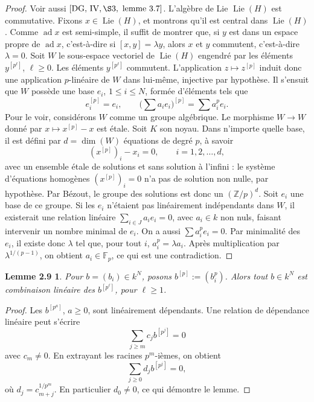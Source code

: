 \documentclass[11pt]{article}
\newcommand{\Lie}{\operatorname{Lie}}
\newtheorem*{lemme29}{Lemme 2.9}
\begin{document}
\begin{proof}
Voir aussi \([\mathrm{DG},\,\mathrm{IV},\S3,\text{ lemme }3.7]\). L'algèbre de Lie
\(\Lie(H)\) est commutative. Fixons \(x\in\Lie(H)\), et montrons qu'il est central dans
\(\Lie(H)\). Comme \(\operatorname{ad}x\) est semi-simple, il suffit de montrer que, si
\(y\) est dans un espace propre de \(\operatorname{ad}x\), c'est-à-dire si
\([x,y]=\lambda y\), alors \(x\) et \(y\) commutent, c'est-à-dire \(\lambda=0\). Soit
\(W\) le sous-espace vectoriel de \(\Lie(H)\) engendré par les éléments
\(y^{[p^\ell]}\), \(\ell\ge0\). Les éléments \(y^{[p^\ell]}\) commutent. L'application
\(z\mapsto z^{[p]}\) induit donc une application \(p\)-linéaire de \(W\) dans lui-même,
injective par hypothèse. Il s'ensuit que \(W\) possède une base \(e_i\),
\(1\le i\le N\), formée d'éléments tels que
\[
  e_i^{[p]}=e_i,
  \qquad
  \Big(\sum a_i e_i\Big)^{[p]}=\sum a_i^p e_i.
\]
Pour le voir, considérons \(W\) comme un groupe algébrique. Le morphisme \(W\to W\)
donné par \(x\mapsto x^{[p]}-x\) est étale. Soit \(K\) son noyau. Dans n'importe
quelle base, il est défini par \(d=\dim(W)\) équations de degré \(p\), à savoir
\[
  (x^{[p]})_i-x_i=0,
  \qquad i=1,2,\ldots,d,
\]
avec un ensemble étale de solutions et sans solution à l'infini : le système d'équations
homogènes \((x^{[p]})_i=0\) n'a pas de solution non nulle, par hypothèse. Par Bézout,
le groupe des solutions est donc un \((\mathbb Z/p)^d\). Soit \(e_i\) une base de ce
groupe. Si les \(e_i\) n'étaient pas linéairement indépendants dans \(W\), il existerait
une relation linéaire \(\sum_{i\in J} a_i e_i=0\), avec \(a_i\in k\) non nuls, faisant
intervenir un nombre minimal de \(e_i\). On a aussi \(\sum a_i^p e_i=0\). Par minimalité
des \(e_i\), il existe donc \(\lambda\) tel que, pour tout \(i\), \(a_i^p=\lambda a_i\).
Après multiplication par \(\lambda^{1/(p-1)}\), on obtient \(a_i\in\mathbb F_p\), ce
qui est une contradiction.
\end{proof}

\begin{lemme29}
Pour \(b=(b_i)\in k^N\), posons \(b^{[p]}:=(b_i^p)\). Alors tout \(b\in k^N\) est
combinaison linéaire des \(b^{[p^\ell]}\), pour \(\ell\ge1\).
\end{lemme29}

\begin{proof}
Les \(b^{[p^a]}\), \(a\ge0\), sont linéairement dépendants. Une relation de dépendance
linéaire peut s'écrire
\begin{equation}
  \sum_{j\ge m} c_j b^{[p^j]}=0
  \tag{2.9.1}
\end{equation}
avec \(c_m\ne0\). En extrayant les racines \(p^m\)-ièmes, on obtient
\begin{equation}
  \sum_{j\ge0} d_j b^{[p^j]}=0,
  \tag{2.9.2}
\end{equation}
où \(d_j=c_{m+j}^{1/p^m}\). En particulier \(d_0\ne0\), ce qui démontre le lemme.
\end{proof}
\end{document}
